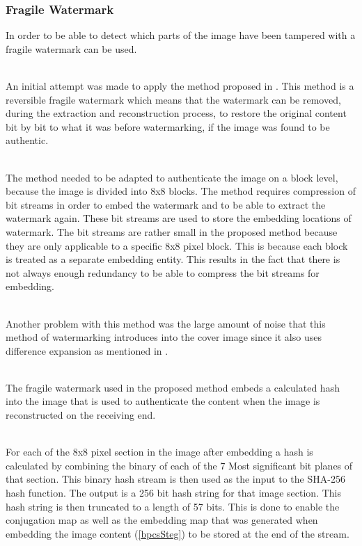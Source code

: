 \documentclass[12pt]{article}
\begin{document}
\subsubsection{Fragile Watermark}
\label{impFragileWatermark}
In order to be able to detect which parts of the image have been tampered with a fragile watermark can be used.

\hspace{0pt} \\
An initial attempt was made to apply the method proposed in \cite{tian2002wavelet}.
This method is a reversible fragile watermark which means that the watermark can be removed, during the extraction and reconstruction process, to restore the original content bit by bit to what it was before watermarking, if the image was found to be authentic.

\hspace{0pt} \\
The method needed to be adapted to authenticate the image on a block level, because the image is divided into 8x8 blocks.
The method requires compression of bit streams in order to embed the watermark and to be able to extract the watermark again.
These bit streams are used to store the embedding locations of watermark.
The bit streams are rather small in the proposed method because they are only applicable to a specific 8x8 pixel block. 
This is because each block is treated as a separate embedding entity.
This results in the fact that there is not always enough redundancy to be able to compress the bit streams for embedding.

\hspace{0pt} \\
Another problem with this method was the large amount of noise that this method of watermarking introduces into the cover image since it also uses difference expansion as mentioned in \cite{tian2002reversible}.

\hspace{0pt} \\
The fragile watermark used in the proposed method embeds a calculated hash into the image that is used to authenticate the content when the image is reconstructed on the receiving end.

\hspace{0pt} \\
For each of the 8x8 pixel section in the image after embedding a hash is calculated by combining the binary of each of the 7 Most significant bit planes of that section. This binary hash stream is then used as the input to the SHA-256 hash function.
The output is a 256 bit hash string for that image section.
This hash string is then truncated to a length of 57 bits.
This is done to enable the conjugation map as well as the embedding map that was generated when embedding the image content (\ref{bpcsSteg}) to be stored at the end of the stream.
\end{document}
